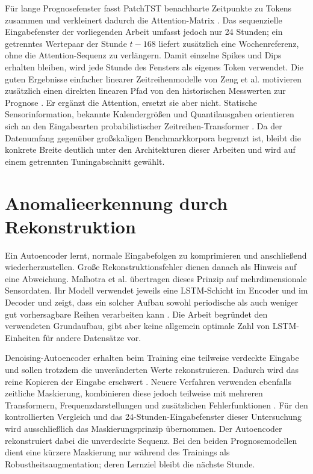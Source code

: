 Für lange Prognosefenster fasst PatchTST benachbarte Zeitpunkte zu Tokens
zusammen und verkleinert dadurch die Attention-Matrix
\cite{nie2023patchtst}. Das sequenzielle Eingabefenster der vorliegenden Arbeit
umfasst jedoch nur 24 Stunden; ein getrenntes Wertepaar der Stunde $t-168$
liefert zusätzlich eine Wochenreferenz, ohne die Attention-Sequenz zu
verlängern. Damit einzelne Spikes und Dips erhalten bleiben, wird jede Stunde
des Fensters als eigenes Token verwendet. Die guten Ergebnisse einfacher linearer
Zeitreihenmodelle von Zeng et al. motivieren zusätzlich einen direkten linearen
Pfad von den historischen Messwerten zur Prognose
\cite{zeng2023transformers}. Er ergänzt die Attention, ersetzt sie aber nicht.
Statische Sensorinformation, bekannte Kalendergrößen und Quantilausgaben
orientieren sich an den Eingabearten probabilistischer
Zeitreihen-Transformer \cite{lim2021tft}. Da der Datenumfang gegenüber
großskaligen Benchmarkkorpora begrenzt ist, bleibt die konkrete Breite
deutlich unter den Architekturen dieser Arbeiten und wird auf einem getrennten
Tuningabschnitt gewählt.

\section{Anomalieerkennung durch Rekonstruktion}

Ein Autoencoder lernt, normale Eingabefolgen zu komprimieren und anschließend
wiederherzustellen. Große Rekonstruktionsfehler dienen danach als Hinweis auf
eine Abweichung. Malhotra et al. übertragen dieses Prinzip auf mehrdimensionale
Sensordaten. Ihr Modell verwendet jeweils eine LSTM-Schicht im Encoder und im
Decoder und zeigt, dass ein solcher Aufbau sowohl periodische als auch weniger
gut vorhersagbare Reihen verarbeiten kann \cite{malhotra2016encdec}. Die Arbeit
begründet den verwendeten Grundaufbau, gibt aber keine allgemein optimale Zahl
von LSTM-Einheiten für andere Datensätze vor.

Denoising-Autoencoder erhalten beim Training eine teilweise verdeckte Eingabe
und sollen trotzdem die unveränderten Werte rekonstruieren. Dadurch wird das
reine Kopieren der Eingabe erschwert \cite{vincent2008denoising}. Neuere
Verfahren verwenden ebenfalls zeitliche Maskierung, kombinieren diese jedoch
teilweise mit mehreren Transformern, Frequenzdarstellungen und zusätzlichen
Fehlerfunktionen \cite{fang2024tfmae}. Für den kontrollierten Vergleich und
das 24-Stunden-Eingabefenster dieser Untersuchung wird ausschließlich das
Maskierungsprinzip übernommen. Der Autoencoder rekonstruiert dabei die
unverdeckte Sequenz. Bei den beiden Prognosemodellen dient eine kürzere
Maskierung nur während des Trainings als Robustheitsaugmentation; deren
Lernziel bleibt die nächste Stunde.

